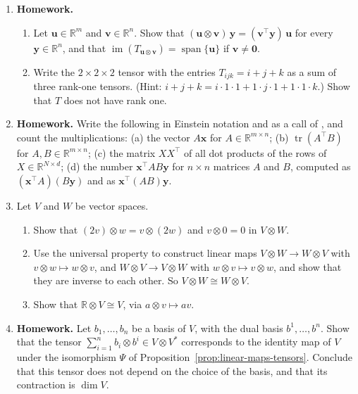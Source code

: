 \documentclass[11pt]{article}
\newcommand{\homework}{\textcolor{red!70!black}{\textbf{Homework.}}}
\newcommand{\py}[1]{\texttt{\detokenize{#1}}}
\theoremstyle{definition}
\theoremstyle{plain}
\theoremstyle{remark}
\DeclareMathOperator{\im}{im}
\DeclareMathOperator{\Span}{span}
\DeclareMathOperator{\tr}{tr}
\begin{document}
\begin{enumerate}[leftmargin=*]
\begin{enumerate}
		\item Let $P$ be invertible. Show that the matrix $P^\top AP$ of $\beta$ in the basis of the columns of $P$ is symmetric if $A$ is, and that $\det(P^\top AP) = \det(P)^2\det(A)$. So the sign of the determinant of the matrix of a bilinear form does not depend on the basis, but its value does.
	\end{enumerate}
	\item \homework{} \begin{enumerate}
		\item Let $\mathbf{u} \in \mathbb{R}^m$ and $\mathbf{v} \in \mathbb{R}^n$. Show that $(\mathbf{u} \otimes \mathbf{v})\,\mathbf{y} = (\mathbf{v}^\top \mathbf{y})\,\mathbf{u}$ for every $\mathbf{y} \in \mathbb{R}^n$, and that $\im(T_{\mathbf{u} \otimes \mathbf{v}}) = \Span\{\mathbf{u}\}$ if $\mathbf{v} \neq \mathbf{0}$.
		\item Write the $2 \times 2 \times 2$ tensor with the entries $T_{ijk} = i + j + k$ as a sum of three rank-one tensors. (Hint: $i + j + k = i \cdot 1 \cdot 1 + 1 \cdot j \cdot 1 + 1 \cdot 1 \cdot k$.) Show that $T$ does not have rank one.
	\end{enumerate}
	\item \homework{} Write the following in Einstein notation and as a call of \py{np.einsum}, and count the multiplications: (a) the vector $A\mathbf{x}$ for $A \in \mathbb{R}^{m \times n}$; (b) $\tr(A^\top B)$ for $A, B \in \mathbb{R}^{m \times n}$; (c) the matrix $XX^\top$ of all dot products of the rows of $X \in \mathbb{R}^{N \times d}$; (d) the number $\mathbf{x}^\top AB\mathbf{y}$ for $n \times n$ matrices $A$ and $B$, computed as $(\mathbf{x}^\top A)(B\mathbf{y})$ and as $\mathbf{x}^\top (AB)\mathbf{y}$.
	\item Let $V$ and $W$ be vector spaces.
	\begin{enumerate}
		\item Show that $(2v) \otimes w = v \otimes (2w)$ and $v \otimes 0 = 0$ in $V \otimes W$.
		\item Use the universal property to construct linear maps $V \otimes W \to W \otimes V$ with $v \otimes w \mapsto w \otimes v$, and $W \otimes V \to V \otimes W$ with $w \otimes v \mapsto v \otimes w$, and show that they are inverse to each other. So $V \otimes W \cong W \otimes V$.
		\item Show that $\mathbb{R} \otimes V \cong V$, via $a \otimes v \mapsto av$.
	\end{enumerate}
	\item \homework{} Let $b_1, \ldots, b_n$ be a basis of $V$, with the dual basis $b^1, \ldots, b^n$. Show that the tensor $\sum_{i=1}^n b_i \otimes b^i \in V \otimes V^*$ corresponds to the identity map of $V$ under the isomorphism $\Psi$ of Proposition~\ref{prop:linear-maps-tensors}. Conclude that this tensor does not depend on the choice of the basis, and that its contraction is $\dim V$.
\end{enumerate}
\end{document}
